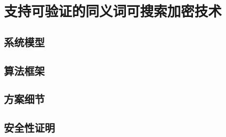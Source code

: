 
\chapter{支持可验证的同义词可搜索加密技术}
\label{chap:synonym_verified}


\section{系统模型}
\label{sec:synonym_verified_model}

\section{算法框架}
\label{sec:synonym_verified_algo}


\section{方案细节}
\label{sec:synonym_verified_scheme}


\section{安全性证明}
\label{sec:synonym_verified_security}
